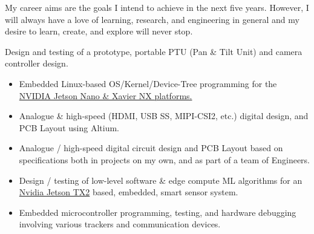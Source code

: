 \documentclass[10pt,a4paper,withhyper]{altacv}
\begin{document}
\vspace{1mm}
My career aims are the goals I intend to achieve in the next five years. However, I will always have a love of learning, research, and engineering in general and my desire to learn, create, and explore will never stop.


\medskip


\begin{paracol}{2}




Design and testing of a prototype, portable PTU (Pan \& Tilt Unit) and camera controller design.
\begin{itemize}
\item Embedded Linux-based OS/Kernel/Device-Tree programming for the \href{https://developer.nvidia.com/embedded/jetson-modules}{NVIDIA Jetson Nano \& Xavier NX platforms.}
\item Analogue \& high-speed (HDMI, USB SS, MIPI-CSI2, etc.) digital design, and PCB Layout using Altium.
\end{itemize}


\divider


\begin{itemize}
\item Analogue / high-speed digital circuit design and PCB Layout based on specifications both in projects on my own, and as part of a team of Engineers.
\item Design / testing of low-level software \& edge compute ML algorithms for an \href{https://developer.nvidia.com/embedded/jetson-modules}{Nvidia Jetson TX2} based, embedded, smart sensor system.
\item Embedded microcontroller programming, testing, and hardware debugging involving various trackers and communication devices.
\end{itemize}



\end{paracol}
\end{document}
